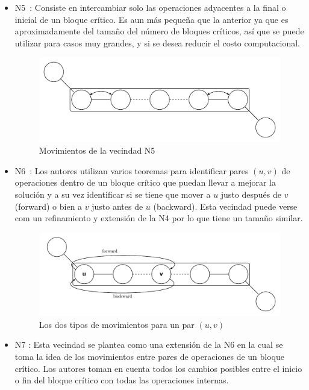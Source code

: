\begin{itemize}
\item N5~\cite{EugeniuszNowicki2003}: Consiste en intercambiar solo las operaciones adyacentes a la final o inicial de un bloque crítico. 
%
Es aun más pequeña que la anterior ya que es aproximadamente del tamaño del número de bloques críticos, así que se puede utilizar para casos muy grandes, y si se desea
reducir el costo computacional.
\begin{figure}[H]
\centering
\includegraphics[scale=.7]{Imagenes/N5.pdf}
\caption{Movimientos de la vecindad N5}
\end{figure}

\item N6~\cite{Balas1998}: Los autores utilizan varios teoremas para identificar pares $(u,v)$ de operaciones dentro de un bloque crítico que puedan llevar a mejorar la 
solución y a su vez identificar si se tiene que mover a $u$ justo después de $v$(forward) o bien a $v$ justo antes de $u$ (backward). 
%
Esta vecindad puede verse com un refinamiento y extensión de la N4 por lo que tiene un tamaño similar.
\begin{figure}[H]
\centering
\includegraphics[scale=.7]{Imagenes/N6.pdf}
\caption{Los dos tipos de movimientos para un par $(u,v)$}
\end{figure}

\item N7 \cite{Zhang2007}: Esta vecindad se plantea como una extensión de la N6 en la cual se toma la idea de los movimientos entre pares de operaciones de un bloque crítico. 
%
Los autores toman en cuenta todos los cambios posibles entre el inicio o fin del bloque crítico con todas las operaciones internas.


\end{itemize}
